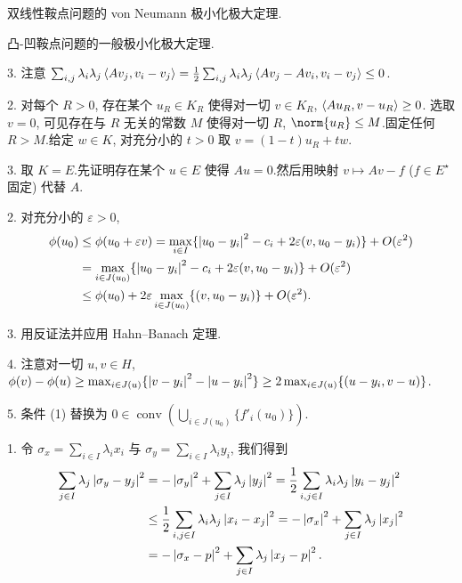 
双线性鞍点问题的 von Neumann 极小化极大定理.


凸-凹鞍点问题的一般极小化极大定理.


3. 注意 $\sum_{i,j}\lambda_i\lambda_j\left\langle Av_j,v_i-v_j\right\rangle=\frac12\sum_{i,j}\lambda_i\lambda_j\left\langle Av_j-Av_i,v_i-v_j\right\rangle\le0$.


2. 对每个 $R>0$, 存在某个 $u_R\in K_R$ 使得对一切 $v\in K_R$, $\left\langle Au_R,v-u_R\right\rangle\ge0$.
选取 $v=0$, 可见存在与 $R$ 无关的常数 $M$ 使得对一切 $R$, $\norm{u_R}\le M$.固定任何
$R>M$.给定 $w\in K$, 对充分小的 $t>0$ 取 $v=(1-t)u_R+tw$.

3. 取 $K=E$.先证明存在某个 $u\in E$ 使得 $Au=0$.然后用映射 $v\mapsto Av-f$ ($f\in E^\star$ 固定)
代替 $A$.


2. 对充分小的 $\varepsilon>0$,
\begin{align*}
\phi(u_0)&\le\phi(u_0+\varepsilon v)=\max_{i\in I}\{\left|u_0-y_i\right|^2-c_i+2\varepsilon(v,u_0-y_i)\}+O(\varepsilon^2)\\
&=\max_{i\in J(u_0)}\{\left|u_0-y_i\right|^2-c_i+2\varepsilon(v,u_0-y_i)\}+O(\varepsilon^2)\\
&\le\phi(u_0)+2\varepsilon\max_{i\in J(u_0)}\{(v,u_0-y_i)\}+O(\varepsilon^2).
\end{align*}

3. 用反证法并应用 Hahn--Banach 定理.

4. 注意对一切 $u,v\in H$,
$\phi(v)-\phi(u)\ge\max_{i\in J(u)}\{\left|v-y_i\right|^2-\left|u-y_i\right|^2\}\ge2\max_{i\in J(u)}\{(u-y_i,v-u)\}$.

5. 条件 (1) 替换为 $0\in\operatorname{conv}\left(\bigcup_{i\in J(u_0)}\{f'_i(u_0)\}\right)$.


1. 令 $\sigma_x=\sum_{i\in I}\lambda_ix_i$ 与 $\sigma_y=\sum_{i\in I}\lambda_iy_i$, 我们得到
\begin{align*}
\sum_{j\in I}\lambda_j\left|\sigma_y-y_j\right|^2&=-\left|\sigma_y\right|^2+\sum_{j\in I}\lambda_j\left|y_j\right|^2
=\frac12\sum_{i,j\in I}\lambda_i\lambda_j\left|y_i-y_j\right|^2\\
&\le\frac12\sum_{i,j\in I}\lambda_i\lambda_j\left|x_i-x_j\right|^2=-\left|\sigma_x\right|^2+\sum_{j\in I}\lambda_j\left|x_j\right|^2\\
&=-\left|\sigma_x-p\right|^2+\sum_{j\in I}\lambda_j\left|x_j-p\right|^2.
\end{align*}

